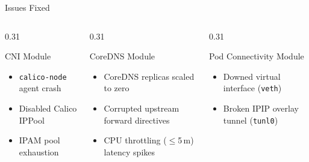 \documentclass[aspectratio=169, 11pt]{beamer}
\begin{document}
\begin{frame}{Issues Fixed}

\begin{columns}[T]
\begin{column}{0.31\textwidth}
\begin{block}{CNI Module}
\footnotesize
\begin{itemize}
  \item \texttt{calico-node} agent crash
  \item Disabled Calico IPPool
  \item IPAM pool exhaustion
\end{itemize}
\end{block}
\end{column}

\begin{column}{0.31\textwidth}
\begin{block}{CoreDNS Module}
\footnotesize
\begin{itemize}
  \item CoreDNS replicas scaled to zero
  \item Corrupted upstream forward directives
  \item CPU throttling ($\leq$5\,m) latency spikes
\end{itemize}
\end{block}
\end{column}

\begin{column}{0.31\textwidth}
\begin{block}{Pod Connectivity Module}
\footnotesize
\begin{itemize}
  \item Downed virtual interface (\texttt{veth})
  \item Broken IPIP overlay tunnel (\texttt{tunl0})
\end{itemize}
\end{block}
\end{column}
\end{columns}

\end{frame}
\end{document}
